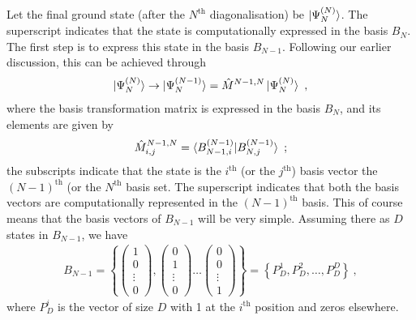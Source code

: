 \documentclass[reprint]{revtex4-2}
\begin{document}
Let the final ground state (after the \(N^\text{th}\) diagonalisation) be \(\ket{\Psi_N^{(N)}}\). The superscript indicates that the state is computationally expressed in the basis \(B_N\). The first step is to express this state in the basis \(B_{N-1}\). Following our earlier discussion, this can be achieved through
\begin{equation}\begin{aligned}
	\ket{\Psi_N^{(N)}} \to \ket{\Psi_N^{(N - 1)}} = \hat M^{N-1, N}\ket{\Psi_N^{(N)}}~,
\end{aligned}\end{equation}
where the basis transformation matrix is expressed in the basis \(B_N\), and its elements are given by
\begin{equation}\begin{aligned}\label{actualTransform}
	\hat M^{N-1, N}_{i, j} = \braket{B_{N-1, i}^{(N-1)} | B_{N, j}^{(N-1)}}~;
\end{aligned}\end{equation}
the subscripts indicate that the state is the \(i^\text{th}\) (or the \(j^\text{th}\)) basis vector the \((N-1)^\text{th}\) (or the \(N^\text{th}\) basis set. The superscript indicates that both the basis vectors are computationally represented in the \((N-1)^\text{th}\) basis. This of course means that the basis vectors of \(B_{N-1}\) will be very simple. Assuming there as \(D\) states in \(B_{N-1}\), we have
\begin{equation}\begin{aligned}\label{identity}
	B_{N-1} = \left\{ \begin{pmatrix} 1 \\ 0 \\ \vdots \\ 0\end{pmatrix}, \begin{pmatrix} 0 \\ 1 \\ \vdots \\ 0\end{pmatrix} \ldots \begin{pmatrix} 0 \\ 0 \\ \vdots \\ 1\end{pmatrix}\right\} = \left\{ P^1_D, P^2_D, \ldots, P^D_D \right\} ~,
\end{aligned}\end{equation}
where \(P^i_D\) is the vector of size \(D\) with 1 at the \(i^\text{th}\) position and zeros elsewhere. 
\end{document}
